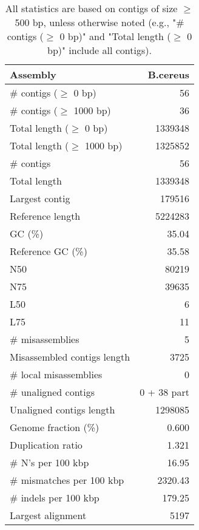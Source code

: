 \documentclass[12pt,a4paper]{article}
\begin{document}
\begin{table}[ht]
\begin{center}
\caption{All statistics are based on contigs of size $\geq$ 500 bp, unless otherwise noted (e.g., "\# contigs ($\geq$ 0 bp)" and "Total length ($\geq$ 0 bp)" include all contigs).}
\begin{tabular}{|l*{1}{|r}|}
\hline
Assembly & B.cereus \\ \hline
\# contigs ($\geq$ 0 bp) & 56 \\ \hline
\# contigs ($\geq$ 1000 bp) & 36 \\ \hline
Total length ($\geq$ 0 bp) & 1339348 \\ \hline
Total length ($\geq$ 1000 bp) & 1325852 \\ \hline
\# contigs & 56 \\ \hline
Total length & 1339348 \\ \hline
Largest contig & 179516 \\ \hline
Reference length & 5224283 \\ \hline
GC (\%) & 35.04 \\ \hline
Reference GC (\%) & 35.58 \\ \hline
N50 & 80219 \\ \hline
N75 & 39635 \\ \hline
L50 & 6 \\ \hline
L75 & 11 \\ \hline
\# misassemblies & 5 \\ \hline
Misassembled contigs length & 3725 \\ \hline
\# local misassemblies & 0 \\ \hline
\# unaligned contigs & 0 + 38 part \\ \hline
Unaligned contigs length & 1298085 \\ \hline
Genome fraction (\%) & 0.600 \\ \hline
Duplication ratio & 1.321 \\ \hline
\# N's per 100 kbp & 16.95 \\ \hline
\# mismatches per 100 kbp & 2320.43 \\ \hline
\# indels per 100 kbp & 179.25 \\ \hline
Largest alignment & 5197 \\ \hline
\end{tabular}
\end{center}
\end{table}
\end{document}
